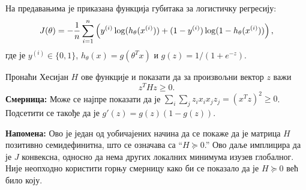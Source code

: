 \item {}

На предавањима је приказана функција губитака за логистичку регресију:
\begin{equation*}
	J(\theta)
	= -\frac{1}{{n}} \sum_{i=1}^{n} \left(y^{(i)}\log(h_{\theta}(x^{(i)}))
		+  (1 - y^{(i)})\log(1 - h_{\theta}(x^{(i)}))\right),
\end{equation*}
где је $y^{(i)} \in \{0, 1\}$, $h_\theta(x) = g(\theta^T x)$ и $g(z) = 1 / (1 + e^{-z})$.

Пронаћи Хесијан $H$ ове функције и показати да за произвољни вектор $z$ важи
%
\begin{equation*}
    z^T H z \ge 0.
\end{equation*}
%
{\bf Смерница:} Може се најпре показати да је $\sum_i\sum_j z_i x_i x_j z_j = (x^Tz)^2 \geq 0$. Подсетити се такође да је $g'(z) = g(z)(1-g(z))$.

{\bf Напомена:} Ово је један од уобичајених начина да се покаже да је матрица $H$ позитивно семидефинитна, што се означава са ``$H \succeq 0$.'' Ово даље имплицира да је $J$ конвексна, односно да нема других локалних минимума изузев глобалног. Није неопходно користити горњу смерницу како би се показало да је $H \succeq 0$ већ било коју.

